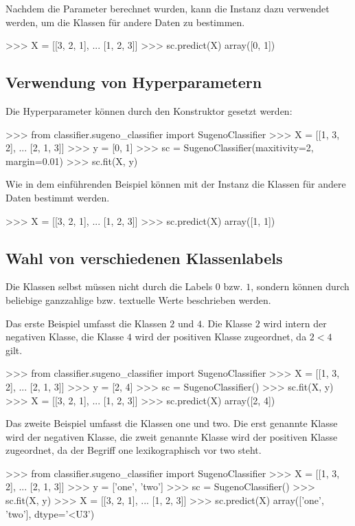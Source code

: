 \documentclass[12pt, a4paper]{article}
\begin{document}
Nachdem die Parameter berechnet wurden, kann die Instanz dazu verwendet werden, um die Klassen für andere Daten zu bestimmen.

\begin{python}
>>> X = [[3, 2, 1],
...      [1, 2, 3]]
>>> sc.predict(X)
array([0, 1])
\end{python}

\subsection{Verwendung von Hyperparametern}
Die Hyperparameter können durch den Konstruktor gesetzt werden:

\begin{python}
>>> from classifier.sugeno_classifier import SugenoClassifier
>>> X = [[1, 3, 2],
...      [2, 1, 3]]
>>> y = [0, 1]
>>> sc = SugenoClassifier(maxitivity=2, margin=0.01)
>>> sc.fit(X, y)
\end{python}

Wie in dem einführenden Beispiel können mit der Instanz die Klassen für andere Daten bestimmt werden.

\begin{python}
>>> X = [[3, 2, 1],
...      [1, 2, 3]]
>>> sc.predict(X)
array([1, 1])
\end{python}

\subsection{Wahl von verschiedenen Klassenlabels}
Die Klassen selbst müssen nicht durch die Labels $0$ bzw. $1$, sondern können durch beliebige ganzzahlige bzw. textuelle Werte beschrieben werden.

Das erste Beispiel umfasst die Klassen $2$ und $4$. Die Klasse $2$ wird intern der negativen Klasse, die Klasse $4$ wird der positiven Klasse zugeordnet, da $2<4$ gilt.

\begin{python}
>>> from classifier.sugeno_classifier import SugenoClassifier
>>> X = [[1, 3, 2],
...      [2, 1, 3]]
>>> y = [2, 4]
>>> sc = SugenoClassifier()
>>> sc.fit(X, y)
>>> X = [[3, 2, 1],
...      [1, 2, 3]]
>>> sc.predict(X)
array([2, 4])

\end{python}

Das zweite Beispiel umfasst die Klassen \glqq one\grqq{} und \glqq two\grqq{}. Die erst genannte Klasse wird der negativen Klasse, die zweit genannte Klasse wird der positiven Klasse zugeordnet, da der Begriff \glqq one\grqq{} lexikographisch vor \glqq two\grqq{} steht.

\begin{python}
>>> from classifier.sugeno_classifier import SugenoClassifier
>>> X = [[1, 3, 2],
...      [2, 1, 3]]
>>> y = ['one', 'two']
>>> sc = SugenoClassifier()
>>> sc.fit(X, y)
>>> X = [[3, 2, 1],
...      [1, 2, 3]]
>>> sc.predict(X)
array(['one', 'two'], dtype='<U3')

\end{python}
\end{document}
